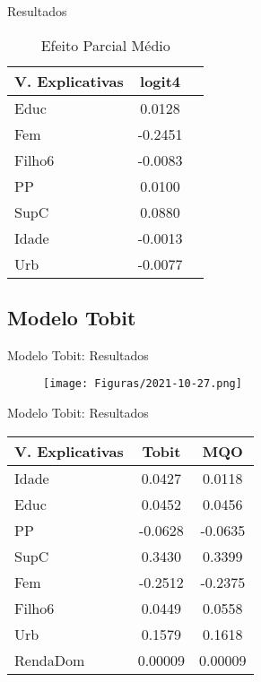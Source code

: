\documentclass[xcolor={dvipsnames}]{beamer}
\begin{document}
\begin{frame}{Resultados}
    \begin{table}[H]
    \caption{Efeito Parcial Médio}
    \centering
    \begin{tabular}{l|cc}\hline
    \textbf{V. Explicativas} & \textbf{logit4}  \\\hline
    Educ            & 0.0128  \\
    Fem             & -0.2451 \\
    Filho6          & -0.0083 \\
    PP              & 0.0100  \\
    SupC            & 0.0880  \\
    Idade           & -0.0013 \\
    Urb             & -0.0077 \\\hline
    \end{tabular}
\end{table}
\end{frame}
\subsection{Modelo Tobit}
\begin{frame}{Modelo Tobit: Resultados}
\begin{figure}
    \centering
    \texttt{[image: Figuras/2021-10-27.png]}
\end{figure}
\end{frame}
\begin{frame}{Modelo Tobit: Resultados}
    \begin{table}[H]
    \centering
    \begin{tabular}{l|cc}\hline
    V. Explicativas & Tobit   & MQO     \\\hline
    Idade           & 0.0427  & 0.0118  \\
    Educ            & 0.0452  & 0.0456  \\
    PP              & -0.0628 & -0.0635 \\
    SupC            & 0.3430  & 0.3399  \\
    Fem             & -0.2512 & -0.2375 \\
    Filho6          & 0.0449  & 0.0558  \\
    Urb             & 0.1579  & 0.1618  \\
    RendaDom        & 0.00009 & 0.00009 \\\hline
    \end{tabular}
\end{table}
\end{frame}
\end{document}
